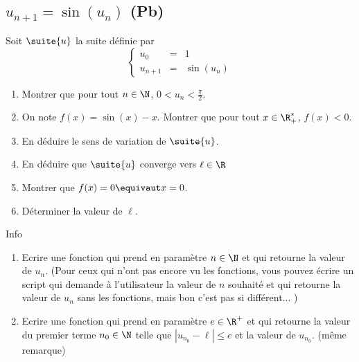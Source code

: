 \subsection{$u_{n+1}=\sin(u_n)$ (Pb)}

\begin{exercice}
Soit $\suite{u}$ la suite définie par 
$$\left\{ 
\begin{array}{ccl}
u_0&=&1\\
u_{n+1} &=& \sin(u_n)
\end{array}
\right.$$

\begin{enumerate}
\item Montrer que pour tout $n\in \N$, $0<u_n<\frac{\pi}{2}$.
\item On note $f(x) = \sin(x)-x$. Montrer que pour tout $x\in \R_+^*$, $f(x)<0.$
\item En déduire le sens de variation de $\suite{u}$.
\item En déduire que $\suite{u}$ converge vers $\ell \in \R$
\item  Montrer que $f(x)=0 \equivaut x=0$.
\item Déterminer la valeur de $\ell$. 
\end{enumerate}

Info 
\begin{enumerate}
\item Ecrire une fonction qui prend en paramètre $n\in \N$ et qui retourne la valeur de $u_n$. (Pour ceux qui n'ont pas encore vu les fonctions, vous pouvez écrire un script qui demande à l'utilisateur la valeur de $n$ souhaité et qui retourne la valeur de $u_n$ sans les fonctions, mais bon c'est pas si différent... ) 
\item 
Ecrire une fonction qui prend en paramètre $e\in \R^+$ et qui retourne la valeur du premier terme $n_0\in \N$ telle que $|u_{n_0}-\ell| \leq e$ et la valeur de $u_{n_0}$. (même remarque) 
\end{enumerate}

\end{exercice}

